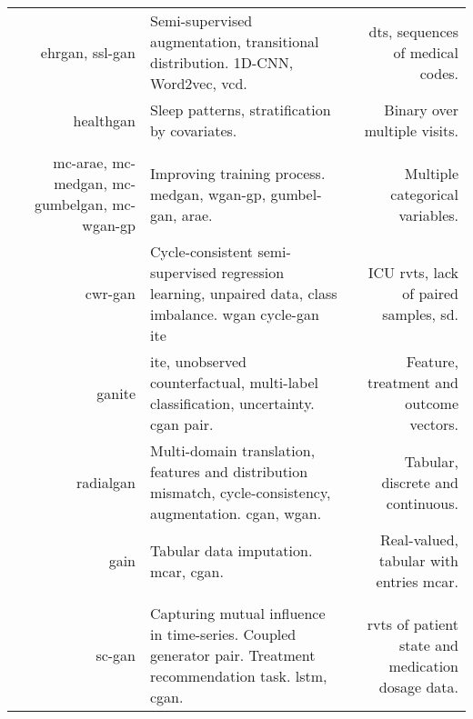 \begin{center}
\begin{longtable}[l]{@{}p{}NMR@{}}
        \citeauthor{Che_2017} & \gls{ehrgan}, \gls{ssl-gan} 
        & Semi-supervised augmentation, transitional distribution. 1D-CNN, Word2vec, \gls{vcd}.
        & \Gls{dts}, sequences of medical codes. \\
        
        \citeauthor{dash2019synthetic} & \gls{healthgan} & Sleep patterns, stratification by covariates. & Binary over multiple visits.\\
        
        \hline
         & & & \\
        \hline
        
        \citeauthor{Camino2018-re} & \raggedright \gls{mc-arae}, \gls{mc-medgan}, \gls{mc-gumbelgan}, \gls{mc-wgan-gp}
        & Improving training process. \gls{medgan}, \gls{wgan-gp}, \gls{gumbel-gan}, \gls{arae}.
        & Multiple categorical variables. \\
        
        \citeauthor{mcdermott2018semi} & \gls{cwr-gan}
        & Cycle-consistent semi-supervised regression learning, unpaired data, class imbalance. \gls{wgan} \gls{cycle-gan} \gls{ite}
        & ICU \gls{rvts}, lack of paired samples, \gls{sd}. \\
        
        \citeauthor{Yoon2018-ite} & \gls{ganite} 
        & \gls{ite}, unobserved counterfactual, multi-label classification, uncertainty. \gls{cgan} pair.
        & Feature, treatment and outcome vectors.\\
        
        \citeauthor{Yoon2018-radial} & \gls{radialgan} 
        & Multi-domain translation, features and distribution mismatch, cycle-consistency, augmentation. \gls{cgan}, \gls{wgan}.
        & Tabular, discrete and continuous.\\
        
        \citeauthor{yoon2018imputation} & \gls{gain}
        & Tabular data imputation. \gls{mcar}, \gls{cgan}.
        & Real-valued, tabular with entries \gls{mcar}.\\
        
        \hline
         & & & \\
        \hline
        
        \citeauthor{Wang_2019} & \gls{sc-gan}
        & Capturing mutual influence in time-series. Coupled generator pair. Treatment recommendation task. \gls{lstm}, \gls{cgan}.
        & \Gls{rvts} of patient state and medication dosage data.\\
        

\end{longtable}
\end{center}
